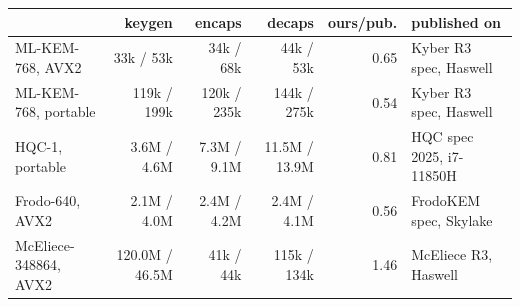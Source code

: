 \begin{tabular}{lrrrrl}
\toprule
 & keygen & encaps & decaps & ours/pub. & published on \\
\midrule
ML-KEM-768, AVX2 & 33k / 53k & 34k / 68k & 44k / 53k & 0.65 & Kyber R3 spec, Haswell \\
ML-KEM-768, portable & 119k / 199k & 120k / 235k & 144k / 275k & 0.54 & Kyber R3 spec, Haswell \\
HQC-1, portable & 3.6M / 4.6M & 7.3M / 9.1M & 11.5M / 13.9M & 0.81 & HQC spec 2025, i7-11850H \\
Frodo-640, AVX2 & 2.1M / 4.0M & 2.4M / 4.2M & 2.4M / 4.1M & 0.56 & FrodoKEM spec, Skylake \\
McEliece-348864, AVX2 & 120.0M / 46.5M & 41k / 44k & 115k / 134k & 1.46 & McEliece R3, Haswell \\
\bottomrule
\end{tabular}
